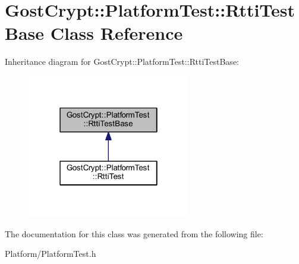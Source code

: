 \hypertarget{class_gost_crypt_1_1_platform_test_1_1_rtti_test_base}{}\section{Gost\+Crypt\+:\+:Platform\+Test\+:\+:Rtti\+Test\+Base Class Reference}
\label{class_gost_crypt_1_1_platform_test_1_1_rtti_test_base}


Inheritance diagram for Gost\+Crypt\+:\+:Platform\+Test\+:\+:Rtti\+Test\+Base\+:
\nopagebreak
\begin{figure}[H]
\begin{center}
\leavevmode
\includegraphics[width=202pt]{class_gost_crypt_1_1_platform_test_1_1_rtti_test_base__inherit__graph}
\end{center}
\end{figure}


The documentation for this class was generated from the following file\+:\begin{DoxyCompactItemize}
\item 
Platform/Platform\+Test.\+h\end{DoxyCompactItemize}
